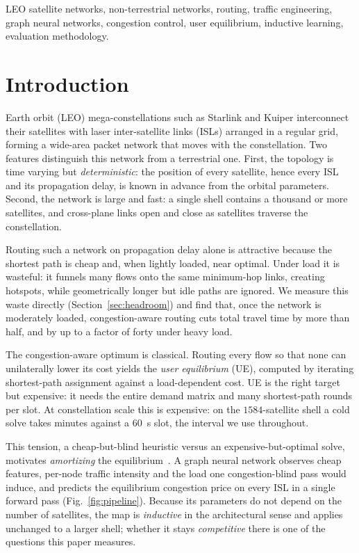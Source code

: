 \documentclass[journal]{IEEEtran}
\begin{document}
\begin{IEEEkeywords}
LEO satellite networks, non-terrestrial networks, routing, traffic engineering,
graph neural networks, congestion control, user equilibrium, inductive learning,
evaluation methodology.
\end{IEEEkeywords}

\section{Introduction}
 Earth orbit (LEO) mega-constellations such as Starlink and
Kuiper interconnect their satellites with laser inter-satellite links (ISLs)
arranged in a regular grid, forming a wide-area packet network that moves with the
constellation. Two features distinguish this network from a terrestrial one. First,
the topology is time varying but \emph{deterministic}: the position of every
satellite, hence every ISL and its propagation delay, is known in advance from the
orbital parameters. Second, the network is large and fast: a single shell contains a
thousand or more satellites, and cross-plane links open and close as satellites
traverse the constellation.

Routing such a network on propagation delay alone is attractive because the shortest
path is cheap and, when lightly loaded, near optimal. Under load it is wasteful: it
funnels many flows onto the same minimum-hop links, creating hotspots, while
geometrically longer but idle paths are ignored. We measure this waste directly
(Section~\ref{sec:headroom}) and find that, once the network is moderately loaded,
congestion-aware routing cuts total travel time by more than half, and by up to a
factor of forty under heavy load.

The congestion-aware optimum is classical. Routing every flow so that none can
unilaterally lower its cost yields the \emph{user equilibrium} (UE), computed by
iterating shortest-path assignment against a load-dependent cost. UE is the right
target but expensive: it needs the entire demand matrix and many shortest-path rounds
per slot. At constellation scale this is expensive: on the $1584$-satellite shell a cold solve takes minutes against a $60$~s slot, the interval we use throughout.

This tension, a cheap-but-blind heuristic versus an expensive-but-optimal solve, motivates \emph{amortizing} the equilibrium~\cite{amos2023}. A graph neural network observes cheap features, per-node traffic intensity and the load one congestion-blind pass would induce, and predicts the equilibrium congestion price on every ISL in a single forward pass (Fig.~\ref{fig:pipeline}). Because its parameters do not depend on the number of satellites, the map is \emph{inductive} in the architectural sense and applies unchanged to a larger shell; whether it stays \emph{competitive} there is one of the questions this paper measures.
\end{document}
